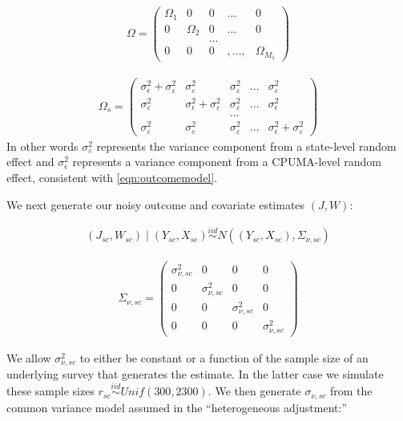 \begin{align*}
    \Omega = \begin{pmatrix}
    \Omega_1 & 0 & 0 & ... & 0 \\
    0 & \Omega_2 & 0 &  ...  & 0 \\
    & & ...  & & \\
    0 & 0 & 0 &, ..., & \Omega_{M_1} 
    \end{pmatrix}
\end{align*}

\begin{align*}
    \Omega_s = \begin{pmatrix}
    \sigma^2_{\epsilon} + \sigma^2_{\varepsilon} & \sigma^2_{\varepsilon} & \sigma^2_{\varepsilon} & ... & \sigma^2_{\varepsilon} \\
    \sigma^2_{\varepsilon} & \sigma^2_{\epsilon} + \sigma^2_{\varepsilon} & \sigma^2_{\varepsilon}& ... & \sigma^2_{\epsilon} \\
    & & ... & & \\
    \sigma^2_{\varepsilon} & \sigma^2_{\varepsilon} & \sigma^2_{\varepsilon} & ... & \sigma^2_{\epsilon} + \sigma^2_{\varepsilon}
    \end{pmatrix}
\end{align*}
%
In other words $\sigma^2_{\varepsilon}$ represents the variance component from a state-level random effect and $\sigma^2_{\epsilon}$ represents a variance component from a CPUMA-level random effect, consistent with \eqref{eqn:outcomemodel}.

We next generate our noisy outcome and covariate estimates $(J, W)$:

\begin{align*}
(J_{sc}, W_{sc}) \mid (Y_{sc}, X_{sc}) \stackrel{iid}\sim N((Y_{sc}, X_{sc}), \Sigma_{\nu, sc})
\end{align*}

\begin{align*}
    \Sigma_{\nu, sc} = \begin{pmatrix}
    \sigma^2_{\nu, sc} & 0 & 0 & 0 \\
    0 & \sigma^2_{\nu, sc} & 0 & 0 \\
    0 & 0 & \sigma^2_{\nu, sc} & 0 \\
    0 & 0 & 0 & \sigma^2_{\nu, sc}
    \end{pmatrix}
\end{align*}

We allow $\sigma^2_{\nu, sc}$ to either be constant or a function of the sample size of an underlying survey that generates the estimate. In the latter case we simulate these sample sizes $r_{sc} \stackrel{iid}\sim Unif(300, 2300)$. We then generate $\sigma_{\nu, sc}$ from the common variance model assumed in the ``heterogeneous adjustment:''

